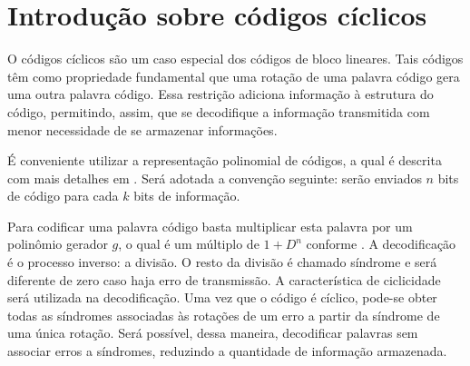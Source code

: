 \section{Introdução sobre códigos cíclicos}
O códigos cíclicos são um caso especial dos códigos de bloco lineares. Tais códigos têm como propriedade fundamental que uma rotação de uma palavra código gera uma outra palavra código. Essa restrição adiciona informação à estrutura do código, permitindo, assim, que se decodifique a informação transmitida com menor necessidade de se armazenar informações.

É conveniente utilizar a representação polinomial de códigos, a qual é descrita com mais detalhes em \cite{ref:roteiro}. Será adotada a convenção seguinte: serão enviados $n$ bits de código para cada $k$ bits de informação.

Para codificar uma palavra código basta multiplicar esta palavra por um polinômio gerador $g$, o qual é um múltiplo de $1+D^n$ conforme \cite{ref:roteiro}. A decodificação é o processo inverso: a divisão. O resto da divisão é chamado síndrome e será diferente de zero caso haja erro de transmissão. A característica de ciclicidade será utilizada na decodificação. Uma vez que o código é cíclico, pode-se obter todas as síndromes associadas às rotações de um erro a partir da síndrome de uma única rotação. Será possível, dessa maneira, decodificar palavras sem associar erros a síndromes, reduzindo a quantidade de informação armazenada.